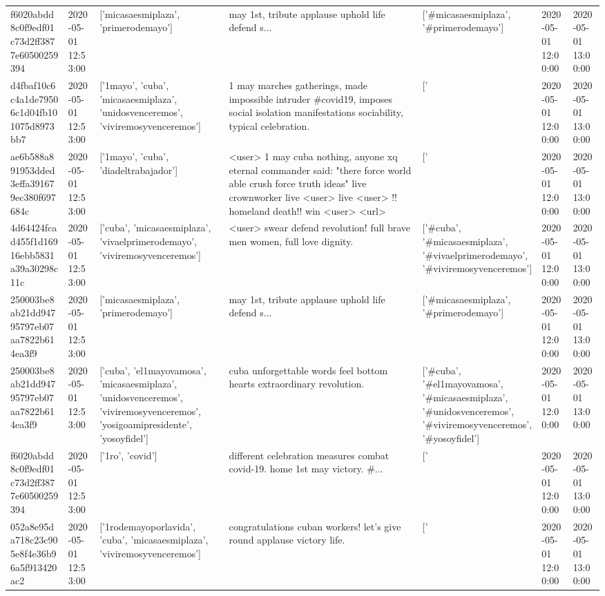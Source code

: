 \begin{tabular}{lllllll}
f6020abdd8c0f9edf01c73d2ff3877e60500259394 & 2020-05-01 12:53:00 & ['micasaesmiplaza', 'primerodemayo'] & may 1st, tribute applause uphold life defend s... & ['#micasaesmiplaza', '#primerodemayo'] & 2020-05-01 12:00:00 & 2020-05-01 13:00:00 \\
d4fbaf10c6c4a1de79506c1d04fb101075d8973bb7 & 2020-05-01 12:53:00 & ['1mayo', 'cuba', 'micasaesmiplaza', 'unidosvenceremos', 'viviremosyvenceremos'] & 1 may marches gatherings, made impossible intruder \#covid19, imposes social isolation manifestations sociability, typical celebration. & ['#1mayo', '#cuba', '#micasaesmiplaza', '#unidosvenceremos', '#viviremosyvenceremos'] & 2020-05-01 12:00:00 & 2020-05-01 13:00:00 \\
ae6b588a891953dded3effa391679ec380f697684c & 2020-05-01 12:53:00 & ['1mayo', 'cuba', 'diadeltrabajador'] & <user> 1 may cuba nothing, anyone xq eternal commander said: "there force world able crush force truth ideas" live crownworker live <user> live <user> !!️homeland death!!️ win <user> <url> & ['#1mayo', '#cuba', '#diadeltrabajador'] & 2020-05-01 12:00:00 & 2020-05-01 13:00:00 \\
4d64424fcad455f1d16916ebb5831a39a30298c11c & 2020-05-01 12:53:00 & ['cuba', 'micasaesmiplaza', 'vivaelprimerodemayo', 'viviremosyvenceremos'] & <user> swear defend revolution! full brave men women, full love dignity. & ['#cuba', '#micasaesmiplaza', '#vivaelprimerodemayo', '#viviremosyvenceremos'] & 2020-05-01 12:00:00 & 2020-05-01 13:00:00 \\
250003be8ab21dd94795797eb07aa7822b614ea3f9 & 2020-05-01 12:53:00 & ['micasaesmiplaza', 'primerodemayo'] & may 1st, tribute applause uphold life defend s... & ['#micasaesmiplaza', '#primerodemayo'] & 2020-05-01 12:00:00 & 2020-05-01 13:00:00 \\
250003be8ab21dd94795797eb07aa7822b614ea3f9 & 2020-05-01 12:53:00 & ['cuba', 'el1mayovamosa', 'micasaesmiplaza', 'unidosvenceremos', 'viviremosyvenceremos', 'yosigoamipresidente', 'yosoyfidel'] & cuba unforgettable words feel bottom hearts extraordinary revolution. & ['#cuba', '#el1mayovamosa', '#micasaesmiplaza', '#unidosvenceremos', '#viviremosyvenceremos', '#yosoyfidel'] & 2020-05-01 12:00:00 & 2020-05-01 13:00:00 \\
f6020abdd8c0f9edf01c73d2ff3877e60500259394 & 2020-05-01 12:53:00 & ['1ro', 'covid'] & different celebration measures combat covid-19. home 1st may victory. \#... & ['#1ro', '#covid'] & 2020-05-01 12:00:00 & 2020-05-01 13:00:00 \\
052a8e95da718c23c905e8f4e36b96a5f913420ac2 & 2020-05-01 12:53:00 & ['1rodemayoporlavida', 'cuba', 'micasaesmiplaza', 'viviremosyvenceremos'] & congratulations cuban workers! let's give round applause victory life. & ['#1rodemayoporlavida', '#cuba', '#micasaesmiplaza', '#viviremosyvenceremos'] & 2020-05-01 12:00:00 & 2020-05-01 13:00:00 \\

\end{tabular}
